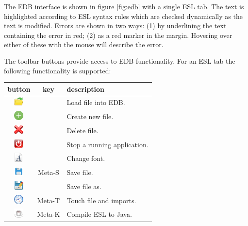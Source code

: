 \documentclass[5p,times]{elsarticle}
\begin{document}
The EDB interface is shown in figure \ref{fig:edb} with a single ESL tab. The text is highlighted according to ESL syntax rules which are checked dynamically as the text is modified. Errors are shown in two ways: (1) by underlining the text containing the error in red; (2) as a red marker in the margin. Hovering over either of these  with the mouse will describe the error. 

The toolbar buttons provide access to EDB functionality. For an ESL tab the following functionality is supported:

\noindent
\begin{tabular}{|c|c|p{2in}|}
\hline
{\bf button}&{\bf key}&{\bf description}\\\hline
\includegraphics[width=0.5cm]{../../icons/load.png}& & Load file into EDB.
\\\hline
\includegraphics[width=0.5cm]{../../icons/new_file}& & Create new file.
\\\hline
\includegraphics[width=0.5cm]{../../icons/delete}& & Delete file.
\\\hline
\includegraphics[width=0.5cm]{../../icons/stop}& & Stop a running application.
\\\hline
\includegraphics[width=0.5cm]{../../icons/font}& & Change font.
\\\hline
\includegraphics[width=0.5cm]{../../icons/save}& Meta-S & Save file.
\\\hline
\includegraphics[width=0.5cm]{../../icons/save_as}& & Save file as.
\\\hline
\includegraphics[width=0.5cm]{../../icons/clock}& Meta-T & Touch file and imports.
\\\hline
\includegraphics[width=0.5cm]{../../icons/compile}& Meta-K & Compile ESL to Java.
\\\hline
\end{tabular}
\end{document}
